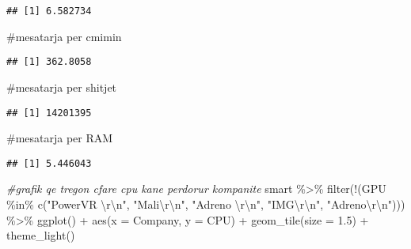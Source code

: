 \documentclass[
]{article}
\newenvironment{Shaded}{\begin{snugshade}}{\end{snugshade}}
\newcommand{\AttributeTok}[1]{\textcolor[rgb]{0.77,0.63,0.00}{#1}}
\newcommand{\CommentTok}[1]{\textcolor[rgb]{0.56,0.35,0.01}{\textit{#1}}}
\newcommand{\FloatTok}[1]{\textcolor[rgb]{0.00,0.00,0.81}{#1}}
\newcommand{\FunctionTok}[1]{\textcolor[rgb]{0.00,0.00,0.00}{#1}}
\newcommand{\NormalTok}[1]{#1}
\newcommand{\SpecialCharTok}[1]{\textcolor[rgb]{0.00,0.00,0.00}{#1}}
\newcommand{\StringTok}[1]{\textcolor[rgb]{0.31,0.60,0.02}{#1}}
\begin{document}
\begin{verbatim}
## [1] 6.582734
\end{verbatim}

\#mesatarja per cmimin

\begin{Shaded}
\end{Shaded}

\begin{verbatim}
## [1] 362.8058
\end{verbatim}

\#mesatarja per shitjet

\begin{Shaded}
\end{Shaded}

\begin{verbatim}
## [1] 14201395
\end{verbatim}

\#mesatarja per RAM

\begin{Shaded}
\end{Shaded}

\begin{verbatim}
## [1] 5.446043
\end{verbatim}

\begin{Shaded}
\begin{Highlighting}[]
\CommentTok{\#grafik qe tregon cfare cpu kane perdorur kompanite}
\NormalTok{smart }\SpecialCharTok{\%\textgreater{}\%}
 \FunctionTok{filter}\NormalTok{(}\SpecialCharTok{!}\NormalTok{(GPU }\SpecialCharTok{\%in\%} \FunctionTok{c}\NormalTok{(}\StringTok{"PowerVR }\SpecialCharTok{\textbackslash{}r\textbackslash{}n}\StringTok{"}\NormalTok{, }\StringTok{"Mali}\SpecialCharTok{\textbackslash{}r\textbackslash{}n}\StringTok{"}\NormalTok{, }\StringTok{"Adreno }\SpecialCharTok{\textbackslash{}r\textbackslash{}n}\StringTok{"}\NormalTok{, }\StringTok{"IMG}\SpecialCharTok{\textbackslash{}r\textbackslash{}n}\StringTok{"}\NormalTok{, }\StringTok{"Adreno}\SpecialCharTok{\textbackslash{}r\textbackslash{}n}\StringTok{"}\NormalTok{))) }\SpecialCharTok{\%\textgreater{}\%}
 \FunctionTok{ggplot}\NormalTok{() }\SpecialCharTok{+}
  \FunctionTok{aes}\NormalTok{(}\AttributeTok{x =}\NormalTok{ Company, }\AttributeTok{y =}\NormalTok{ CPU) }\SpecialCharTok{+}
  \FunctionTok{geom\_tile}\NormalTok{(}\AttributeTok{size =} \FloatTok{1.5}\NormalTok{) }\SpecialCharTok{+}
  \FunctionTok{theme\_light}\NormalTok{()}
\end{Highlighting}
\end{Shaded}
\end{document}
